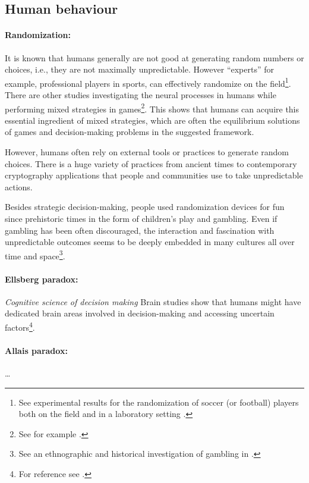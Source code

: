 \documentclass{article}
\begin{document}
\subsection*{Human behaviour}

\paragraph{Randomization:}
It is known that humans generally are not good at generating random numbers or choices, i.e., they are not maximally unpredictable. However ``experts'' for example, professional players in sports, can effectively randomize on the field\footnote{See experimental results for the randomization of soccer (or football) players both on the field and in a laboratory setting \cite{paper:MinimaxExperiment01,paper:MinimaxExperiment02,paper:MinimaxExperiment03}.}. There are other studies investigating the neural processes in humans while performing mixed strategies in games\footnote{See for example \cite{paper:PrimateRandomArticle}.}.
This shows that humans can acquire this essential ingredient of mixed strategies, which are often the equilibrium solutions of games and decision-making problems in the suggested framework.

However, humans often rely on external tools or practices to generate random choices. There is a huge variety of practices from ancient times to contemporary cryptography applications that people and communities use to take unpredictable actions.

Besides strategic decision-making, people used randomization devices for fun since prehistoric times in the form of children's play and gambling. Even if gambling has been often discouraged, the interaction and fascination with unpredictable outcomes seems to be deeply embedded in many cultures all over time and space\footnote{See an ethnographic and historical investigation of gambling in \cite{paper:GamblingAcrossCultures}.}.

\paragraph{Ellsberg paradox:}
{\it Cognitive science of decision making}
Brain studies show that humans might have dedicated brain areas involved in decision-making and accessing uncertain factors\footnote{For reference see \cite{thesis:NeuralDecisionMaking}.}.


\paragraph{Allais paradox:}
\dots 
\end{document}
